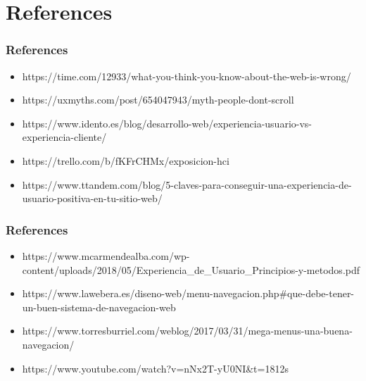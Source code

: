 \documentclass[11pt]{beamer}
\begin{document}
\section{References}
\begin{frame}
\frametitle{References}
\begin{itemize}
\item https://time.com/12933/what-you-think-you-know-about-the-web-is-wrong/
\item https://uxmyths.com/post/654047943/myth-people-dont-scroll
\item https://www.idento.es/blog/desarrollo-web/experiencia-usuario-vs-experiencia-cliente/
\item https://trello.com/b/fKFrCHMx/exposicion-hci
\item https://www.ttandem.com/blog/5-claves-para-conseguir-una-experiencia-de-usuario-positiva-en-tu-sitio-web/
\end{itemize}
\end{frame}
\begin{frame}
\frametitle{References}
\begin{itemize}
\item https://www.mcarmendealba.com/wp-content/uploads/2018/05/Experiencia\_de\_Usuario\_Principios-y-metodos.pdf 
\item https://www.lawebera.es/diseno-web/menu-navegacion.php#que-debe-tener-un-buen-sistema-de-navegacion-web
\item https://www.torresburriel.com/weblog/2017/03/31/mega-menus-una-buena-navegacion/
\item https://www.youtube.com/watch?v=nNx2T-yU0NI&t=1812s
\end{itemize}
\end{frame}
\end{document}
